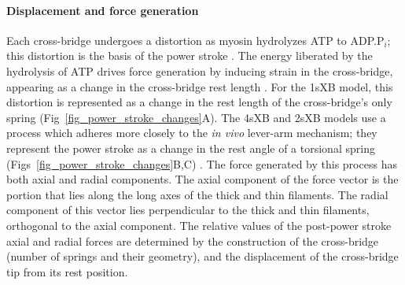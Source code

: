 \documentclass[10pt]{article}
\newcommand{\citep}[1]{\cite{#1}} %
\begin{document}
\paragraph{Displacement and force generation} %
Each cross-bridge undergoes a distortion as myosin hydrolyzes ATP to ADP.P$_i$; this distortion is the basis of the power stroke \citep{Pate1989, Daniel1998, Tanner2007}. 
The energy liberated by the hydrolysis of ATP drives force generation by inducing strain in the cross-bridge, appearing as a change in the cross-bridge rest length \citep{HowardBook}.  
For the 1sXB model, this distortion is represented as a change in the rest length of the cross-bridge's only spring (Fig~\ref{fig_power_stroke_changes}A). 
The 4sXB and 2sXB models use a process which adheres more closely to the \emph{in vivo} lever-arm mechanism; they represent the power stroke as a change in the rest angle of a torsional spring (Figs~\ref{fig_power_stroke_changes}B,C) \citep{Reedy2000}.
The force generated by this process has both axial and radial components. 
The axial component of the force vector is the portion that lies along the long axes of the thick and thin filaments. 
The radial component of this vector lies perpendicular to the thick and thin filaments, orthogonal to the axial component. 
The relative values of the post-power stroke axial and radial forces are determined by the construction of the cross-bridge (number of springs and their geometry), and the displacement of the cross-bridge tip from its rest position. 
\end{document}
